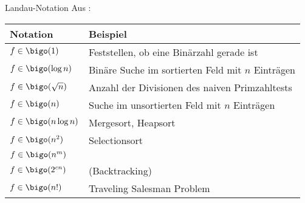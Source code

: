 \begin{example}{Landau-Notation}
    Aus \cite{wiki:Landau-Symbole} :

    \begin{tabular}{l|l}
        Notation                & Beispiel                                          \\
        \hline
        $f \in \bigo(1)$        & Feststellen, ob eine Binärzahl gerade ist         \\
        $f \in \bigo(\log n)$   & Binäre Suche im sortierten Feld mit $n$ Einträgen \\
        $f \in \bigo(\sqrt{n})$ & Anzahl der Divisionen des naiven Primzahltests    \\
        $f \in \bigo(n)$        & Suche im unsortierten Feld mit $n$ Einträgen      \\
        $f \in \bigo(n\log n)$  & Mergesort, Heapsort                               \\
        $f \in \bigo(n^2)$      & Selectionsort                                     \\
        $f \in \bigo(n^m)$      &                                                   \\
        $f \in \bigo(2^{cn})$   & (Backtracking)                                    \\
        $f \in \bigo(n!)$       & Traveling Salesman Problem
    \end{tabular}
\end{example}

